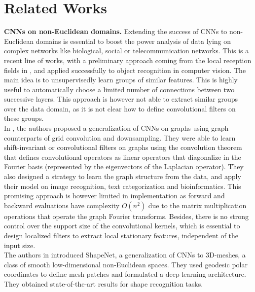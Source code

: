 \documentclass{article}
\begin{document}
\section{Related Works}
\vspace{-0.2cm}
{\bf CNNs on non-Euclidean domains.} Extending the success of CNNs to non-Euclidean domains is essential to boost the power analysis of data lying on complex networks like biological, social or telecommunication networks. This is a recent line of works, with a preliminary approach coming from the local reception fields in \cite{pro:GregorLeCun10LRF,pro:CoatesNg11LRF}, and applied successfully to object recognition in computer vision. The main idea is to unsupervisedly learn groups of similar features. This is highly useful to automatically choose a limited number of connections between two successive layers. This approach is however not able to extract similar groups over the data domain, as it is not clear how to define convolutional filters on these groups.  \\
In \cite{art:BrunaZarembaSzlamLeCun13DLgraphs,art:HenaffBrunaLeCun15DLgraphs}, the authors proposed a generalization of CNNs on graphs using graph counterparts of grid convolution and downsampling. They were able to learn shift-invariant or convolutional filters on graphs using the convolution theorem \cite{book:Mallat99wavelets} that defines convolutional operators as linear operators that diagonalize in the Fourier basis (represented by the eigenvectors of the Laplacian operator). They also designed a strategy to learn the graph structure from the data, and apply their model on image recognition, text categorization and bioinformatics. This promising approach is however limited in implementation as forward and backward evaluations have complexity $O(n^2)$ due to the matrix multiplication operations that operate the graph Fourier transforms. Besides, there is no strong control over the support size of the convolutional kernels, which is essential to design localized filters to extract local stationary features, independent of the input size. \\
The authors in \cite{pro:MasciBoscainiBronsteinVandergheynst15GeoDL,art:MasciBoscainiBronsteinVandergheynst15ShapeNet} introduced ShapeNet, a generalization of CNNs to 3D-meshes, a class of smooth low-dimensional non-Euclidean spaces. They used geodesic polar coordinates to define mesh patches and formulated a deep learning architecture. They obtained state-of-the-art results for shape recognition tasks.\\
\end{document}
